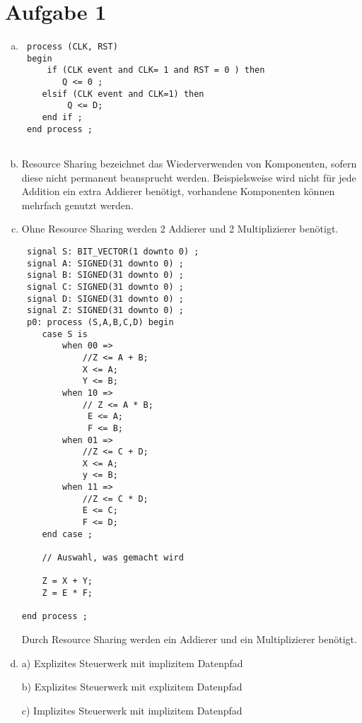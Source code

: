 \documentclass[a4paper]{scrartcl}
\begin{document}
	
	\section*{Aufgabe 1}
	
	\begin{enumerate}[(a)]
		
\item 

\begin{lstlisting}
 process (CLK, RST)
 begin 
	 if (CLK event and CLK= 1 and RST = 0 ) then 
 		Q <= 0 ; 
 	elsif (CLK event and CLK=1) then 
		 Q <= D; 
 	end if ; 
 end process ; 


\end{lstlisting}

\item

Resource Sharing bezeichnet das Wiederverwenden von Komponenten, sofern diese nicht permanent beansprucht werden. Beispielsweise wird nicht für jede Addition ein extra Addierer benötigt, vorhandene Komponenten können mehrfach genutzt werden. 

	
\item

Ohne Resource Sharing werden 2 Addierer und 2 Multiplizierer benötigt.	

	

\begin{lstlisting}
 signal S: BIT_VECTOR(1 downto 0) ; 
 signal A: SIGNED(31 downto 0) ; 
 signal B: SIGNED(31 downto 0) ; 
 signal C: SIGNED(31 downto 0) ; 
 signal D: SIGNED(31 downto 0) ; 
 signal Z: SIGNED(31 downto 0) ; 
 p0: process (S,A,B,C,D) begin 
 	case S is 
 		when 00 => 
 			//Z <= A + B;
 			X <= A;
 			Y <= B;
 		when 10 => 
 			// Z <= A * B; 
 			 E <= A;
 			 F <= B;
  		when 01 =>
			//Z <= C + D; 
			X <= A;
			y <= B;
		when 11 => 
			//Z <= C * D; 
			E <= C;
			F <= D;
	end case ; 

	// Auswahl, was gemacht wird	
	
	Z = X + Y;
	Z = E * F;
	
end process ;

\end{lstlisting}

Durch Resource Sharing werden ein Addierer und ein Multiplizierer benötigt.

\item

a) Explizites Steuerwerk mit implizitem Datenpfad

b) Explizites Steuerwerk mit explizitem Datenpfad

c) Implizites Steuerwerk mit implizitem Datenpfad
	
	\end{enumerate}	
	
\end{document}
